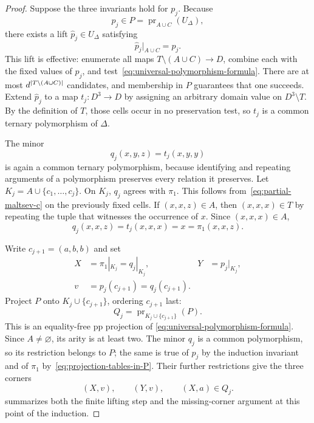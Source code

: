 \documentclass[11pt]{article}
\theoremstyle{plain}
\theoremstyle{definition}
\theoremstyle{remark}
\DeclareMathOperator{\pr}{pr}
\DeclarePairedDelimiter{\abs}{\lvert}{\rvert}
\begin{document}
\begin{proof}
Suppose the three invariants hold for $p_j$.  Because
\[
  p_j\in P=\pr_{A\cup C}(U_\Delta),
\]
there exists a lift $\widehat p_j\in U_\Delta$ satisfying
\begin{equation*}
  \widehat p_j|_{A\cup C}=p_j.
\end{equation*}
This lift is effective: enumerate all maps
$T\setminus(A\cup C)\to D$, combine each with the fixed values of $p_j$,
and test~\eqref{eq:universal-polymorphism-formula}.  There are at most
$d^{\abs{T\setminus(A\cup C)}}$ candidates, and membership in $P$ guarantees
that one succeeds.  Extend $\widehat p_j$ to a map $t_j:D^3\to D$ by assigning
an arbitrary domain value on $D^3\setminus T$.  By the definition of $T$,
those cells occur in no preservation test, so $t_j$ is a common ternary
polymorphism of $\Delta$.

The minor
\begin{equation*}
  q_j(x,y,z)=t_j(x,y,y)
\end{equation*}
is again a common ternary polymorphism, because identifying and repeating
arguments of a polymorphism preserves every relation it preserves.  Let
$K_j=A\cup\{c_1,\ldots,c_j\}$.  On $K_j$, $q_j$ agrees with $\pi_1$.
This follows from~\eqref{eq:partial-maltsev-c} on the previously fixed cells.
If $(x,x,z)\in A$, then $(x,x,x)\in T$ by repeating the tuple that witnesses
the occurrence of $x$.  Since $(x,x,x)\in A$,
\[
  q_j(x,x,z)=t_j(x,x,x)=x=\pi_1(x,x,z).
\]

Write $c_{j+1}=(a,b,b)$ and set
\[
\begin{aligned}
  X&=\pi_1|_{K_j}=q_j|_{K_j},
  &Y&=p_j|_{K_j},\\
  v&=p_j(c_{j+1})=q_j(c_{j+1}).
\end{aligned}
\]
Project $P$ onto $K_j\cup\{c_{j+1}\}$, ordering $c_{j+1}$ last:
\[
  Q_j=\pr_{K_j\cup\{c_{j+1}\}}(P).
\]
This is an equality-free pp projection of
\eqref{eq:universal-polymorphism-formula}.  Since $A\ne\varnothing$, its
arity is at least two.  The minor $q_j$ is a common polymorphism, so its
restriction belongs to $P$; the same is true of $p_j$ by the induction
invariant and of $\pi_1$ by~\eqref{eq:projection-tables-in-P}.  Their further
restrictions give the three corners
\begin{equation*}
  (X,v),\qquad(Y,v),\qquad(X,a)\in Q_j.
\end{equation*}
 summarizes both the finite lifting step
and the missing-corner argument at this point of the induction.


\end{proof}
\end{document}
